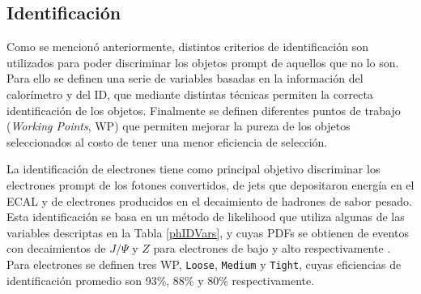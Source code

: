 
\subsection{Identificación}\label{sec:ph_id}

Como se mencionó anteriormente, distintos criterios de identificación son utilizados para poder discriminar los objetos prompt
de aquellos que no lo son. Para ello se definen una serie de variables basadas en la información del calorímetro y del ID, que mediante distintas técnicas permiten la correcta identificación de los objetos. Finalmente se definen diferentes puntos de trabajo (\textit{Working Points}, WP) que permiten mejorar la pureza de los objetos seleccionados al costo de tener una menor eficiencia de selección.

La identificación de electrones tiene como principal objetivo discriminar los electrones prompt de los fotones convertidos, de jets que depositaron energía en el ECAL y de electrones producidos en el decaimiento de hadrones de sabor pesado. Esta identificación se basa en un método de likelihood que utiliza algunas de las variables descriptas en la Tabla \ref{phIDVars}, y cuyas PDFs se obtienen de eventos con decaimientos de $J/\Psi$ y $Z$ para electrones de bajo y alto \ET respectivamente \cite{PERF-2016-01}. Para electrones se definen tres WP, \texttt{Loose}, \texttt{Medium} y \texttt{Tight}, cuyas eficiencias de identificación promedio son  93\%, 88\% y 80\% respectivamente.

